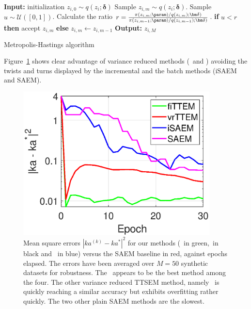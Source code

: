 \documentclass[bj]{imsart}
\numberwithin{equation}{section}
\theoremstyle{plain}
\begin{document}
\begin{algorithm}[H]
\begin{algorithmic}[1]
\STATE \textbf{Input:} initialization $z_{i,0} \sim q(z_{i}; {\bm \delta})$
\STATE Sample $z_{i,m} \sim q(z_{i}; {\bm \delta})$.
\STATE Sample $u \sim \mathcal{U}([0, 1])$.
\STATE Calculate the ratio $r = \frac{\pi(z_{i,m}; \param)/q(z_{i,m}); {\bm \delta})}{\pi(z_{i,m-1}; \param)/q(z_{i,m-1}); {\bm \delta})}$.
\STATE \textbf{if} $u < r$ \textbf{then} accept $z_{i,m}$ \textbf{else} $z_{i,m} \leftarrow z_{i,m-1}$
\ENDFOR
\STATE \textbf{Output:} $z_{i,M}$
\end{algorithmic}
\caption{Metropolis-Hastings algorithm}
\label{alg:mh}
        \end{algorithm}


Figure~\ref{fig:pk_tts} shows clear advantage of variance reduced methods (\SAEMVR\ and \FISAEM ) avoiding the twists and turns displayed by the incremental and the batch methods (iSAEM and SAEM).

\begin{figure}[t]
\centering
\includegraphics[width=4in]{fig2/figpk.eps}
\caption{Mean square errors $|ka^{(k)} - ka^*|^2$ for our methods (\FISAEM\ in green,\SAEMVR\ in black and \ISAEM\ in blue) versus the SAEM baseline in red, against epochs elapsed. The errors have been averaged over $M=50$ synthetic datasets for robustness. The \FISAEM\ appears to be the best method among the four. The other variance reduced TTSEM method, namely \SAEMVR\, is quickly reaching a similar accuracy but exhibits overfitting rather quickly. The two other plain SAEM methods are the slowest.}
\label{fig:pk_tts}
\end{figure}
\end{document}
